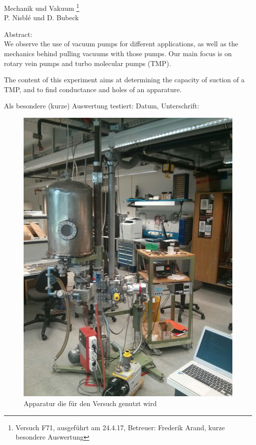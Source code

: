 \documentclass[12pt, a4paper]{scrartcl}
\begin{document}
	
	\thispagestyle{empty}
	\null\vspace{40mm}
	\begin{center}
		{
			\Large Mechanik und Vakuum
			\footnote{
				\noindent Versuch F71, ausgeführt am 24.4.17,
				Betreuer: Frederik Arand,
				kurze besondere Auswertung
			}
		}\\[15mm]
		P. Nisblé und D. Bubeck
		
		\vspace{25mm}
		
		\parbox{0.9\textwidth}{
			Abstract:\\    
			\small We observe the use of vacuum pumps for different applications, as well as the mechanics behind pulling vacuums with those pumps. Our main focus is on rotary vein pumps and turbo molecular pumps (TMP).
            
            The content of this experiment aims at determining the capacity of suction of a TMP, and to find conductance and holes of an apparature.
		}
	\end{center}
	
	\vfill
	Als besondere (kurze) Auswertung testiert: Datum, Unterschrift:
	\vspace{20mm}
	\newpage  
	\null\thispagestyle{empty} 
	
	\begin{figure}[H]
		\centering
		\includegraphics[height=.6\paperheight]{foto1}
		\caption{Apparatur die für den Versuch genutzt wird}
	\end{figure}
	
\end{document}
